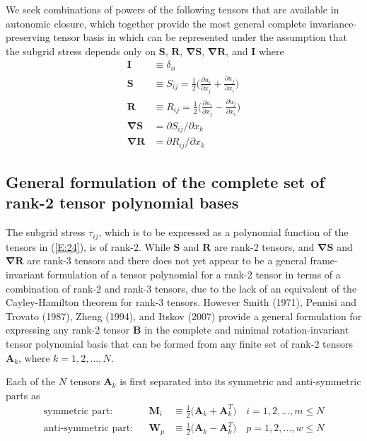 We seek combinations of powers of the following tensors that are available in autonomic closure, which together provide the most general complete invariance-preserving tensor basis in which   can be represented under the assumption that the subgrid stress depends only on $\mathbf{S}$, $\mathbf{R}$, $\mathbf{\nabla S}$, $\mathbf{\nabla R}$, and $\mathbf{I}$ where
%
\begin{subequations}
\label{E:25}
\begin{align}
 	\mathbf{I} &\equiv \delta_{ii} \\
	\mathbf{S} &\equiv S_{ij} = \frac{1}{2} \bigg( \frac{\partial u_i}{\partial x_j} + \frac{\partial u_j}{ \partial x_i} \bigg)  \\
	\mathbf{R} &\equiv R_{ij} = \frac{1}{2} \bigg( \frac{\partial u_i}{\partial x_j} - \frac{\partial u_j}{ \partial x_i} \bigg) \\
	\mathbf{\nabla S} &= \partial S_{ij}/ \partial x_{k} \\
	\mathbf{\nabla R} &= \partial R_{ij}/ \partial x_{k}
\end{align}
\end{subequations}
%
%    

\subsection{General formulation of the complete set of rank-2 tensor polynomial bases}
\label{sec:2A}

The subgrid stress $\tau_{ij}$, which is to be expressed as a polynomial function of the tensors in (\ref{E:24}), is of rank-2.  While $\mathbf{S}$ and $\mathbf{R}$ are rank-2 tensors,   and  $\mathbf{\nabla S}$ and $\mathbf{\nabla R}$ are rank-3 tensors and there does not yet appear to be a general frame-invariant formulation of a tensor polynomial for a rank-2 tensor in terms of a combination of rank-2 and rank-3 tensors, due to the lack of an equivalent of the Cayley-Hamilton theorem for rank-3 tensors.  However Smith (1971), Pennisi and Trovato (1987), Zheng (1994), and Itskov (2007) provide a general formulation for expressing any rank-2 tensor $\mathbf{B}$ in the complete and minimal rotation-invariant tensor polynomial basis that can be formed from any finite set of rank-2 tensors $\mathbf{A}_{k}$, where $k=1,2,\ldots,N$.

Each of the $N$ tensors $\mathbf{A}_{k}$ is first separated into its symmetric and anti-symmetric parts as
%
\begin{subequations}
\label{E:26}
\begin{align}
 	\text{symmetric part:} &&
	\mathbf{M}_{i} &\equiv \frac{1}{2} \big( \mathbf{A}_k + \mathbf{A}^T_k \big) \quad
	i = 1,2, \ldots, m \leq N \\
	\text{anti-symmetric part:} && 
	\mathbf{W}_{p} &\equiv \frac{1}{2} \big( \mathbf{A}_k - \mathbf{A}^T_k \big) \quad
	p = 1,2, \ldots, w \leq N 
\end{align}
\end{subequations}
%
%    

